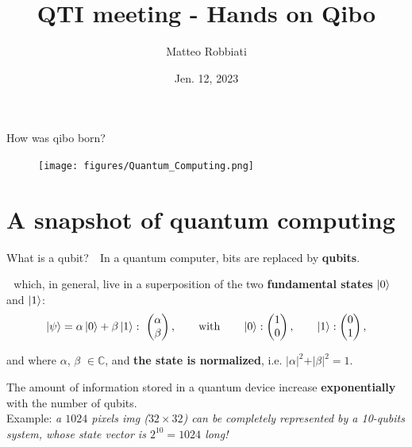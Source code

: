 \documentclass[8pt, xcolor={svgnames}, hyperref={colorlinks,linkcolor=black, citecolor=amethyst, urlcolor=amethyst}]{beamer}
\title{QTI meeting - Hands on Qibo}
\date{Jen. 12, 2023}
\author[Matteo Robbiati]{Matteo Robbiati}
\begin{document}
\maketitle

\begin{frame}{How was qibo born?}
    \begin{figure}  
    \texttt{[image: figures/Quantum\_Computing.png]}
    \end{figure}
    \vspace{-0.5cm}
\end{frame}

\section{A snapshot of quantum computing}

\begin{frame}{What is a qubit?}
\large
\faArrowCircleRight\,\, In a quantum computer, bits are replaced by \textbf{qubits}.
\pause

\faArrowCircleRight\,\, which, in general, live in a superposition of 
the two \textbf{fundamental states} $\ket{0}$ and $\ket{1}$:
\begin{equation*}
    \ket{\psi} = \alpha \ket{0} + \beta \ket{1}: \,\,
    \begin{pmatrix} 
    \alpha \\ 
    \beta 
    \end{pmatrix}, \qquad \text{with} \qquad     
    \ket{0}:
    \begin{pmatrix} 
    1 \\ 
    0  
    \end{pmatrix}, \qquad \ket{1}:
    \begin{pmatrix} 
    0 \\ 
    1 
    \end{pmatrix}, 
\end{equation*}

and where $\alpha$, $\beta$ $\in \mathbb{C}$, and \textbf{the state is normalized}, i.e. $
    \vert \alpha \vert^2 + \vert \beta \vert^2 = 1.
$   
\pause
\vspace{0.8cm}
\begin{tcolorbox}[colback=amethyst!30, title=Storage advantage]
  The amount of information stored in a quantum device increase \textbf{exponentially}
  with the number of qubits. \\
  
  Example: \textit{a $1024$ pixels img ($32 \times 32$) can be completely represented 
  by a 10-qubits system, whose state vector is $2^{10}=1024$ long!}
\end{tcolorbox}
\end{frame}
\end{document}
